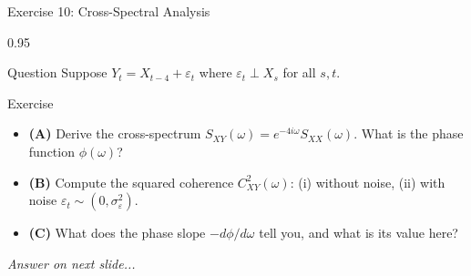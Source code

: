 \documentclass[9pt, aspectratio=169, t]{beamer}
\begin{document}
\begin{frame}{Exercise 10: Cross-Spectral Analysis}
    \begin{cminipage}{0.95\textwidth}
    \begin{alertblock}{Question}
        Suppose $Y_t = X_{t-4} + \varepsilon_t$ where $\varepsilon_t \perp X_s$ for all $s, t$.
    \end{alertblock}

    \vspace{0.2cm}

    \begin{block}{Exercise}
        \begin{itemize}\setlength{\itemsep}{3pt}
            \item \textcolor{MainBlue}{\textbf{(A)}} Derive the cross-spectrum $S_{XY}(\omega) = e^{-4i\omega}S_{XX}(\omega)$. What is the phase function $\phi(\omega)$?
            \item \textcolor{MainBlue}{\textbf{(B)}} Compute the squared coherence $C^2_{XY}(\omega)$: (i) without noise, (ii) with noise $\varepsilon_t \sim (0, \sigma^2_\varepsilon)$.
            \item \textcolor{MainBlue}{\textbf{(C)}} What does the phase slope $-d\phi/d\omega$ tell you, and what is its value here?
        \end{itemize}
    \end{block}

    \vspace{0.2cm}

    \begin{center}
        \textit{Answer on next slide...}
    \end{center}
    \end{cminipage}
\end{frame}
\end{document}

